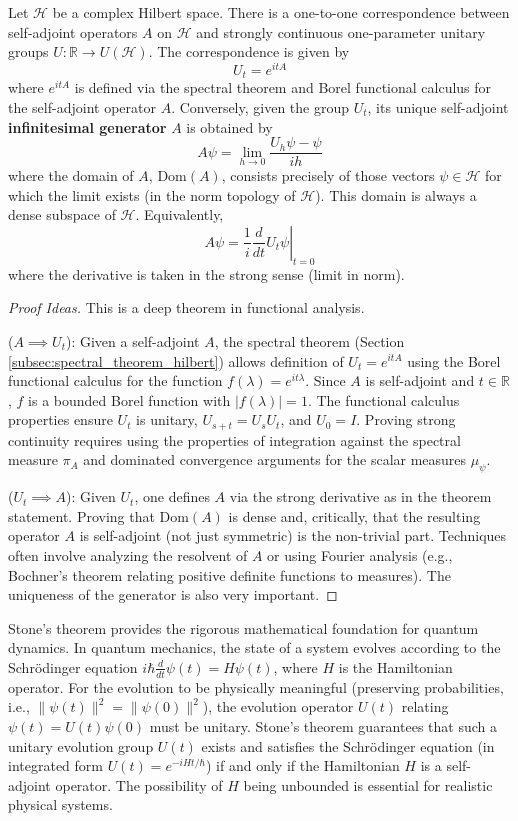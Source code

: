 \begin{theorem}
\label{thm:stone}
Let $\mathcal{H}$ be a complex Hilbert space. There is a one-to-one correspondence between self-adjoint operators $A$ on $\mathcal{H}$ and strongly continuous one-parameter unitary groups $U: \mathbb{R} \to U(\mathcal{H})$. The correspondence is given by
\[ U_t = e^{itA} \]
where $e^{itA}$ is defined via the spectral theorem and Borel functional calculus for the self-adjoint operator $A$. Conversely, given the group $U_t$, its unique self-adjoint \textbf{infinitesimal generator} $A$ is obtained by
\[ A\psi = \lim_{h \to 0} \frac{U_h \psi - \psi}{ih} \]
where the domain of $A$, $\text{Dom}(A)$, consists precisely of those vectors $\psi \in \mathcal{H}$ for which the limit exists (in the norm topology of $\mathcal{H}$). This domain is always a dense subspace of $\mathcal{H}$. Equivalently,
\[ A\psi = \frac{1}{i} \left. \frac{d}{dt} U_t \psi \right|_{t=0} \]
where the derivative is taken in the strong sense (limit in norm).
\end{theorem}
\begin{proof}[Proof Ideas]
This is a deep theorem in functional analysis.

($A \implies U_t$): Given a self-adjoint $A$, the spectral theorem (Section \ref{subsec:spectral_theorem_hilbert}) allows definition of $U_t = e^{itA}$ using the Borel functional calculus for the function $f(\lambda) = e^{it\lambda}$. Since $A$ is self-adjoint and $t \in \mathbb{R}$, $f$ is a bounded Borel function with $|f(\lambda)|=1$. The functional calculus properties ensure $U_t$ is unitary, $U_{s+t}=U_s U_t$, and $U_0=I$. Proving strong continuity requires using the properties of integration against the spectral measure $\pi_A$ and dominated convergence arguments for the scalar measures $\mu_\psi$.

($U_t \implies A$): Given $U_t$, one defines $A$ via the strong derivative as in the theorem statement. Proving that $\text{Dom}(A)$ is dense and, critically, that the resulting operator $A$ is self-adjoint (not just symmetric) is the non-trivial part. Techniques often involve analyzing the resolvent of $A$ or using Fourier analysis (e.g., Bochner's theorem relating positive definite functions to measures). The uniqueness of the generator is also very important.
\end{proof}

Stone's theorem provides the rigorous mathematical foundation for quantum dynamics. In quantum mechanics, the state of a system evolves according to the Schrödinger equation $i\hbar \frac{d}{dt} \psi(t) = H \psi(t)$, where $H$ is the Hamiltonian operator. For the evolution to be physically meaningful (preserving probabilities, i.e., $\|\psi(t)\|^2 = \|\psi(0)\|^2$), the evolution operator $U(t)$ relating $\psi(t) = U(t)\psi(0)$ must be unitary. Stone's theorem guarantees that such a unitary evolution group $U(t)$ exists and satisfies the Schrödinger equation (in integrated form $U(t)=e^{-iHt/\hbar}$) if and only if the Hamiltonian $H$ is a self-adjoint operator. The possibility of $H$ being unbounded is essential for realistic physical systems.

